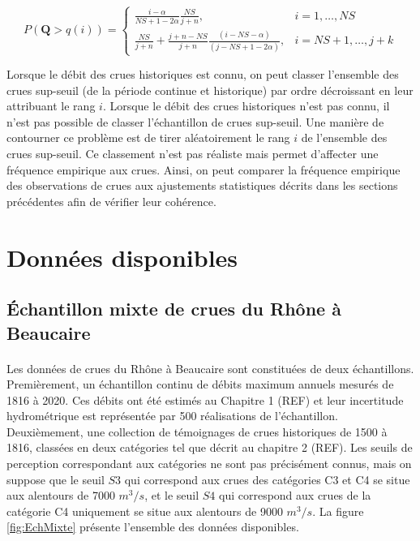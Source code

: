 \documentclass[11pt]{article}
\begin{document}
		\begin{equation}	
		P(\boldsymbol{Q} > q(i)) = \begin{cases}\frac{i-\alpha}{NS+1-2 \alpha} \frac{NS}{j+n}, & i=1, \ldots, NS \\ \frac{NS}{j+n}+\frac{j+n-NS}{j+n} \frac{(i-NS-\alpha)}{(j-NS+1-2\alpha)}, & i=NS+1, \ldots, j+k\end{cases}
		\label{eq:FreqHisto}	
		\end{equation}
	
	Lorsque le débit des crues historiques est connu, on peut classer l'ensemble des crues sup-seuil (de la période continue et historique) par ordre décroissant en leur attribuant le rang $i$. Lorsque le débit des crues historiques n'est pas connu, il n'est pas possible de classer l'échantillon de crues sup-seuil. Une manière de contourner ce problème est de tirer aléatoirement le rang $i$ de l'ensemble des crues sup-seuil. Ce classement n'est pas réaliste mais permet d'affecter une fréquence empirique aux crues. Ainsi, on peut comparer la fréquence empirique des observations de crues aux ajustements statistiques décrits dans les sections précédentes afin de vérifier leur cohérence. 
		
\section{Données disponibles}

	\subsection{Échantillon mixte de crues du Rhône à Beaucaire}
	\paragraph{} Les données de crues du Rhône à Beaucaire sont constituées de deux échantillons. Premièrement, un échantillon continu de débits maximum annuels mesurés de 1816 à 2020. Ces débits ont été estimés au Chapitre 1 (REF) et leur incertitude hydrométrique est représentée par 500 réalisations de l'échantillon. Deuxièmement, une collection de témoignages de crues historiques de 1500 à 1816, classées en deux catégories tel que décrit au chapitre 2 (REF). Les seuils de perception correspondant aux catégories ne sont pas précisément connus, mais on suppose que le seuil $S3$ qui correspond aux crues des catégories C3 et C4 se situe aux alentours de 7000 $m^3/s$, et le seuil $S4$ qui correspond aux crues de la catégorie C4 uniquement se situe aux alentours de 9000 $m^3/s$. La figure \ref{fig:EchMixte} présente l'ensemble des données disponibles. 
	
\end{document}
